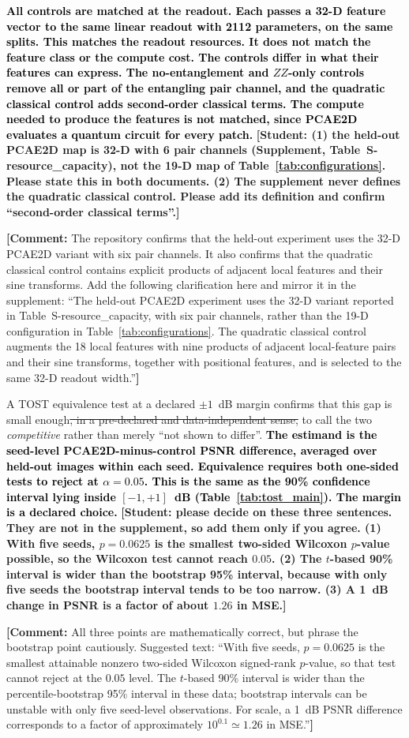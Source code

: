 \documentclass[pdflatex,sn-basic]{sn-jnl}
\newcommand{\del}[1]{\sout{#1}}
\newcommand{\add}[1]{\textbf{\textcolor{black}{#1}}}
\newcommand{\yellowcomment}[1]{%
  \par\smallskip\noindent
  \begingroup\setlength{\fboxsep}{3pt}%
  \colorbox{yellow!35}{\parbox{\dimexpr\linewidth-2\fboxsep\relax}{\textbf{[Comment:} #1\textbf{]}}}%
  \endgroup\par\smallskip}
\begin{document}
\add{All controls are matched at the readout. Each passes a 32-D feature vector
to the same linear readout with 2112 parameters, on the same splits. This
matches the readout resources. It does not match the feature class or the
compute cost. The controls differ in what their features can express. The
no-entanglement and $ZZ$-only controls remove all or part of the entangling
pair channel, and the quadratic classical control adds second-order classical
terms. The compute needed to produce the features is not matched, since PCAE2D
evaluates a quantum circuit for every patch.}
{\color{red}\textbf{[Student: (1) the held-out PCAE2D map is 32-D with 6 pair
channels (Supplement, Table~S-resource\_capacity), not the 19-D map of
Table~\ref{tab:configurations}. Please state this in both documents. (2) The
supplement never defines the quadratic classical control. Please add its
definition and confirm ``second-order classical terms''.]}}
\yellowcomment{The repository confirms that the held-out experiment uses the 32-D PCAE2D variant with six pair channels. It also confirms that the quadratic classical control contains explicit products of adjacent local features and their sine transforms. Add the following clarification here and mirror it in the supplement: ``The held-out PCAE2D experiment uses the 32-D variant reported in Table~S-resource\_capacity, with six pair channels, rather than the 19-D configuration in Table~\ref{tab:configurations}. The quadratic classical control augments the 18 local features with nine products of adjacent local-feature pairs and their sine transforms, together with positional features, and is selected to the same 32-D readout width.''}


A TOST equivalence test \add{\citep{Schuirmann1987, Lakens2017}} at a declared $\pm1$~dB margin confirms that this gap is
small enough\del{, in a pre-declared and data-independent sense,} to call the two
\emph{competitive} rather than merely ``not shown to differ''.
\add{The estimand is the seed-level PCAE2D-minus-control PSNR difference,
averaged over held-out images within each seed. Equivalence requires both
one-sided tests to reject at $\alpha=0.05$. This is the same as the 90\%
confidence interval lying inside $[-1,+1]$~dB (Table~\ref{tab:tost_main}). The
margin is a declared choice.}
{\color{red}\textbf{[Student: please decide on these three sentences. They are
not in the supplement, so add them only if you agree. (1) With five seeds,
$p=0.0625$ is the smallest two-sided Wilcoxon $p$-value possible, so the
Wilcoxon test cannot reach $0.05$. (2) The $t$-based 90\% interval is wider than
the bootstrap 95\% interval, because with only five seeds the bootstrap interval
tends to be too narrow. (3) A 1~dB change in PSNR is a factor of about $1.26$ in
MSE.]}}
\yellowcomment{All three points are mathematically correct, but phrase the bootstrap point cautiously. Suggested text: ``With five seeds, $p=0.0625$ is the smallest attainable nonzero two-sided Wilcoxon signed-rank $p$-value, so that test cannot reject at the $0.05$ level. The $t$-based 90\% interval is wider than the percentile-bootstrap 95\% interval in these data; bootstrap intervals can be unstable with only five seed-level observations. For scale, a 1~dB PSNR difference corresponds to a factor of approximately $10^{0.1}\simeq1.26$ in MSE.''}
\end{document}
